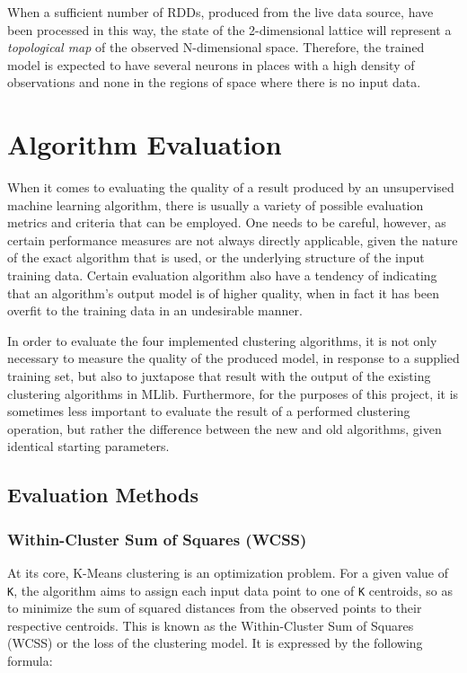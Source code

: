 \documentclass{l4proj}
\begin{document}
When a sufficient number of RDDs, produced from the live data source, have been processed in this way, the state of the 2-dimensional lattice will represent a \textit{topological map} of the observed N-dimensional space. Therefore, the trained model is expected to have several neurons in places with a high density of observations and none in the regions of space where there is no input data.


\chapter{Algorithm Evaluation}
\label{eval}

When it comes to evaluating the quality of a result produced by an unsupervised machine learning algorithm, there is usually a variety of possible evaluation metrics and criteria that can be employed. One needs to be careful, however, as certain performance measures are not always directly applicable, given the nature of the exact algorithm that is used, or the underlying structure of the input training data. Certain evaluation algorithm also have a tendency of indicating that an algorithm's output model is of higher quality, when in fact it has been overfit to the training data in an undesirable manner\cite{Overfit}.

In order to evaluate the four implemented clustering algorithms, it is not only necessary to measure the quality of the produced model, in response to a supplied training set, but also to juxtapose that result with the output of the existing clustering algorithms in MLlib. Furthermore, for the purposes of this project, it is sometimes less important to evaluate the result of a performed clustering operation, but rather the difference between the new and old algorithms, given identical starting parameters. 

\section{Evaluation Methods}

\subsection{Within-Cluster Sum of Squares (WCSS)}

At its core, K-Means clustering is an optimization problem. For a given value of \texttt{K}, the algorithm aims to assign each input data point to one of \texttt{K} centroids, so as to minimize the sum of squared distances from the observed points to their respective centroids. This is known as the Within-Cluster Sum of Squares (WCSS) or the loss of the clustering model. It is expressed by the following formula:
\end{document}
